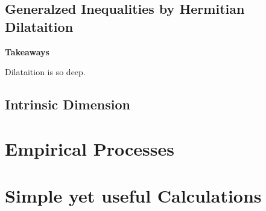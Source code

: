 \documentclass[12pt]{scrreport}
\newenvironment{takeaways}
  {
   \begin{lrbox}{\selvestebox}%
   \begin{minipage}{15cm}
     \textbf{Takeaways}
   }
  {\end{minipage}\end{lrbox}%
   \begin{center}
\setlength\fboxsep{.5cm}
   \colorbox[HTML]{F8E0E0}{\usebox{\selvestebox}}
   \end{center}}
\begin{document}
  \section{Generalzed Inequalities by Hermitian Dilataition}
  
  
  \begin{takeaways}
    Dilataition is so deep.
    \lipsum[3]
  \end{takeaways}
  
  \section{Intrinsic Dimension}
  


\chapter{Empirical Processes}


\chapter{Simple yet useful Calculations} 



\printnomenclature

{}

\end{document}
